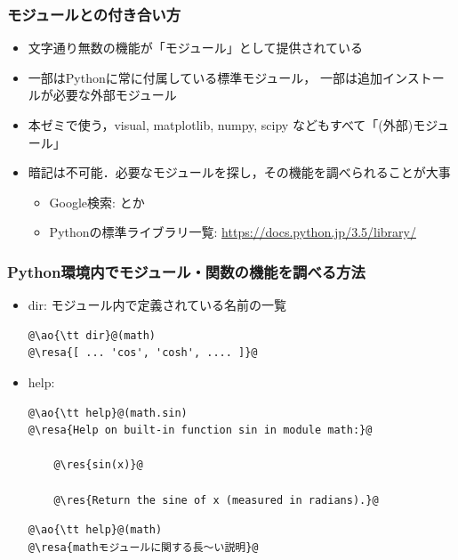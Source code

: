\documentclass[10pt,dvipdfmx]{beamer}
\newcommand{\ore}[1]{{\color{orange}#1}}
\newcommand{\ao}[1]{{\color{blue}#1}}
\newcommand{\resa}[1]{\ore{\textsl{$\rightarrow$ #1}}}
\newcommand{\res}[1]{\ore{\textsl{#1}}}
\begin{document}
\begin{frame}[fragile]
\frametitle{モジュールとの付き合い方}
\begin{itemize}
\item 文字通り無数の機能が「モジュール」として提供されている
\item 一部はPythonに常に付属している標準モジュール，
  一部は追加インストールが必要な外部モジュール
\item 本ゼミで使う，\ao{visual, matplotlib, numpy, scipy}
  などもすべて「(外部)モジュール」
\item 暗記は不可能．必要なモジュールを探し，その機能を調べられることが大事
  \begin{itemize}
  \item Google検索:  とか
  \item Pythonの標準ライブラリ一覧: 
    \url{https://docs.python.jp/3.5/library/}
  \end{itemize}
\end{itemize}
\end{frame}

\begin{frame}[fragile]
\frametitle{Python環境内でモジュール・関数の機能を調べる方法}
\begin{itemize}
\item dir: モジュール内で定義されている名前の一覧
\begin{lstlisting}
@\ao{\tt dir}@(math)
@\resa{[ ... 'cos', 'cosh', .... ]}@
\end{lstlisting}

\item help:
\begin{lstlisting}
@\ao{\tt help}@(math.sin)
@\resa{Help on built-in function sin in module math:}@

    @\res{sin(x)}@

    @\res{Return the sine of x (measured in radians).}@
\end{lstlisting}

\begin{lstlisting}
@\ao{\tt help}@(math)
@\resa{mathモジュールに関する長〜い説明}@
\end{lstlisting}

\end{itemize}
\end{frame}
\end{document}

